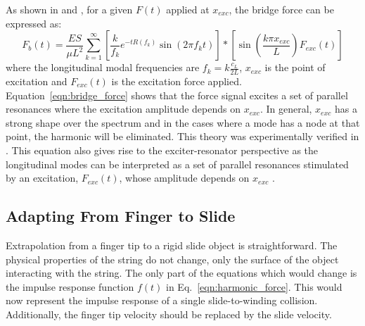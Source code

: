 \documentclass[main.tex]{subfiles}
\begin{document}
As shown in  and , for a given $F(t)$ applied at $x_{exc}$, the bridge force can be expressed as:
\begin{equation}
    F_b(t) = \frac{ES}{\mu L^2} \sum_{k = 1}^{\infty} \left[\frac{k}{f_k} e^{-t R(f_k)} \sin(2\pi f_k t)\right] \ast \left[ \sin\left(\frac{k \pi x_{exc}}{L}\right) F_{exc}(t)\right]
    \label{eqn:bridge_force}
\end{equation}
where the longitudinal modal frequencies are $f_k = k \frac{c_L}{2L}$, $x_{exc}$ is the point of excitation and $F_{exc}(t)$ is the excitation force applied. Equation~\ref{eqn:bridge_force} shows that the force signal excites a set of parallel resonances where the excitation amplitude depends on $x_{exc}$. In general, $x_{exc}$ has a strong shape over the spectrum and in the cases where a mode has a node at that point, the harmonic will be eliminated. This theory was experimentally verified in . This equation also gives rise to the exciter-resonator perspective as the longitudinal modes can be interpreted as a set of parallel resonances stimulated by an excitation, $F_{exc}(t)$, whose amplitude depends on $x_{exc}$ .

\subsection{Adapting From Finger to Slide}
Extrapolation from a finger tip to a rigid slide object is straightforward. The physical properties of the string do not change, only the surface of the object interacting with the string. The only part of the equations which would change is the impulse response function $f(t)$ in Eq.~\ref{eqn:harmonic_force}. This would now represent the impulse response of a single slide-to-winding collision. Additionally, the finger tip velocity should be replaced by the slide velocity.
\end{document}
